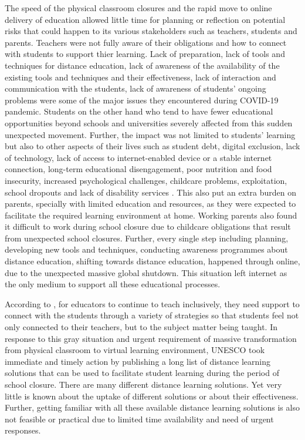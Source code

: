 \documentclass[11pt,a4paper,]{article}
\begin{document}
The speed of the physical classroom closures and the rapid move to online delivery of education allowed little time for planning or reflection on potential risks that could happen to its various stakeholders such as teachers, students and parents. Teachers were not fully aware of their obligations and how to connect with students to support thier learning. Lack of preparation, lack of tools and techniques for distance education, lack of awareness of the availability of the existing tools and techniques and their effectiveness, lack of interaction and communication with the students, lack of awareness of students' ongoing problems were some of the major issues they encountered during COVID-19 pandemic. Students on the other hand who tend to have fewer educational opportunities beyond schools and universities severely affected from this sudden unexpected movement. Further, the impact was not limited to students' learning but also to other aspects of their lives such as student debt, digital exclusion, lack of technology, lack of access to internet-enabled device or a stable internet connection, long-term educational disengagement, poor nutrition and food insecurity, increased psychological challenges, childcare problems, exploitation, school dropouts and lack of disability services \autocite{drane2020impact,daniel2020education,unescoadverse2020,richmond2020critical,carter2021teacher}. This also put an extra burden on parents, specially with limited education and resources, as they were expected to facilitate the required learning environment at home. Working parents also found it difficult to work during school closure due to childcare obligations that result from unexpected school closures. Further, every single step including planning, developing new tools and techniques, conducting awareness programmes about distance education, shifting towards distance education, happened through online, due to the unexpected massive global shutdown. This situation left internet as the only medium to support all these educational processes.

According to \textcite{carter2021teacher}, for educators to continue to teach inclusively, they need support to connect with the students through a variety of strategies so that students feel not only connected to their teachers, but to the subject matter being taught. In response to this gray situation and urgent requirement of massive transformation from physical classroom to virtual learning environment, UNESCO took immediate and timely action by publishing a long list of distance learning solutions that can be used to facilitate student learning during the period of school closure. There are many different distance learning solutions. Yet very little is known about the uptake of different solutions or about their effectiveness. Further, getting familiar with all these available distance learning solutions is also not feasible or practical due to limited time availability and need of urgent responses.
\end{document}
